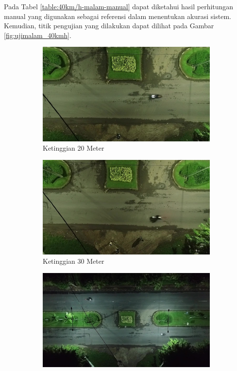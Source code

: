 Pada Tabel \ref{table:40km/h-malam-manual} dapat diketahui hasil perhitungan manual yang digunakan sebagai referensi dalam menentukan akurasi sistem. Kemudian, titik pengujian yang dilakukan dapat dilihat pada Gambar \ref{fig:ujimalam_40kmh}.
\begin{figure}[H]
  \centering
  \begin{subfigure}[b]{0.3\textwidth}
    \centering
    \includegraphics[width=\linewidth]{bab4/20m_malam_20km.jpg}
    \caption{Ketinggian 20 Meter}
    \label{fig:20m_malam_40kmh}
  \end{subfigure}%
  \hfill
  \begin{subfigure}[b]{0.3\textwidth}
    \centering
    \includegraphics[width=\linewidth]{bab4/30m_malam_20km.jpg}
    \caption{Ketinggian 30 Meter}
    \label{fig:30m_malam_40kmh}
  \end{subfigure}%
  \hfill
  \begin{subfigure}[b]{0.3\textwidth}
    \centering
    \includegraphics[width=\linewidth]{bab4/40m_malam_20km.jpg}

\end{subfigure}
\end{figure}
